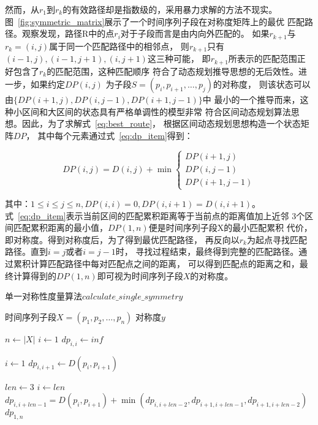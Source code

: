 然而，从$r_1$到$r_k$的有效路径却是指数级的，采用暴力求解的方法不现实。
图~\ref{fig:symmetric_matrix}展示了一个时间序列子段在对称度矩阵上的最优
匹配路径。观察发现，路径R中的点$r_i$对于子段而言是由内向外匹配的。
如果$r_{k+1}$与$r_k=\left(i,j\right)$属于同一个匹配路径中的相邻点，
则$r_{k+1}$只有$(i-1, j),(i-1, j+1),(i, j+1)$这三种可能，
即$r_{k+1}$所表示的匹配范围正好包含了$r_k$的匹配范围，这种匹配顺序
符合了动态规划推导思想的无后效性。进一步，如果约定$D P(i, j)$
为子段$S=\left(p_{i}, p_{i+1}, \dots, p_{j}\right)$的对称度，
则该状态可以由$\{D P(i+1, j), D P(i, j-1), D P(i+1, j-1)\}$中
最小的一个推导而来，这种小区间和大区间的状态具有严格单调性的模型非常
符合区间动态规划算法思想。因此，为了求解式~\ref{eq:best_route}，
根据区间动态规划思想构造一个状态矩阵$DP$， 
其中每个元素通过式~\ref{eq:dp_item}得到：

\begin{equation}
  D P(i, j)=D(i, j)+\min \left\{\begin{array}{c}
    D P(i+1, j) \\
    D P(i, j-1) \\
    D P(i+1, j-1)
  \end{array}\right.
  \label{eq:dp_item}
\end{equation}

其中：$1 \leq i \leq j \leq n, D P(i, i)=0, D P(i, i+1)=D(i, i+1)$。
式~\ref{eq:dp_item}表示当前区间的匹配累积距离等于当前点的距离值加上近邻
3个区间匹配累积距离的最小值，$D P(1, n)$便是时间序列子段X的最小匹配累积
代价，即对称度。得到对称度后，为了得到最优匹配路径，
再反向以$r_k$为起点寻找匹配路径。直到$i=j$或者$i=j-1$时，
寻找过程结束，最终得到完整的匹配路径。通过累积计算匹配路径中每对匹配点之间的距离，
可以得到匹配点的距离之和，最终计算得到的$DP(1,n)$即可视为时间序列子段$X$的对称度。

\renewcommand{\algorithmicrequire}{\textbf{输入：}\unskip}
\renewcommand{\algorithmicensure}{\textbf{输出：}\unskip}

\begin{algorithm}
  \caption{单一对称性度量算法$calculate\_single\_symmetry$}
  \label{alg:single_symmetry}
  \small
  \begin{algorithmic}
    \REQUIRE 时间序列子段$X=\left(p_{1}, p_{2}, \dots, p_{n}\right)$
    \ENSURE 对称度$y$

    \STATE $n \leftarrow \left|X\right|$
    \STATE $i \leftarrow 1$
    \STATE $dp_{i,i} \leftarrow inf$
    \ENDWHILE

    \STATE $i \leftarrow 1$
    \STATE $dp_{i,i+1} \leftarrow D\left(p_{i}, p_{i+1}\right)$
    \ENDWHILE

    \STATE $len \leftarrow 3$
    \STATE $i \leftarrow len$
    \STATE $dp_{i,i+len-1} = D\left(p_{i}, p_{i+1}\right)+\min \left(dp_{i,i+len-2},dp_{i+1,i+len-1},dp_{i+1,i+len-2}\right)$
    \ENDWHILE
    \ENDWHILE
    \RETURN $dp_{1,n}$
  \end{algorithmic}
\end{algorithm}

